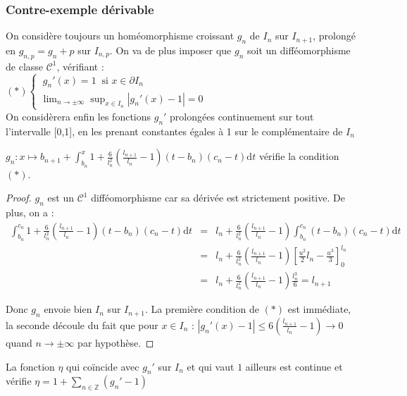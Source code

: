 \documentclass[11pt,a4paper]{article}
\begin{document}
\subsubsection{Contre-exemple dérivable}

On considère toujours un homéomorphisme croissant $g_n$ de $I_n$ sur $I_{n+1}$, prolongé en $g_{n,p} = g_n +p$ sur $I_{n,p}$. On va de plus imposer que $g_n$ soit un difféomorphisme de classe $\mathcal{C}^1$, vérifiant : \\

$(*) \begin{cases}\ g_n'(x)=1 \ \text{ si } x \in \partial I_n \\ \displaystyle \lim_{n \to \pm \infty}\sup_{x\in I_n}|g_n'(x)-1|=0 \end{cases}$ \\

On considèrera enfin les fonctions $g_n'$ prolongées continuement sur tout l'intervalle [0,1], en les prenant constantes égales à 1 sur le complémentaire de $I_n$

\begin{lemma}
$\displaystyle g_n : x \mapsto b_{n+1} + \int_{b_n}^x 1 + \frac{6}{l_n^2}(\frac{l_{n+1}}{l_n} -1)(t-b_n)(c_n-t)\mathrm{d}t$ vérifie la condition $(*)$.
\end{lemma}

\begin{proof}
$g_n$ est un $\mathcal{C}^1$ difféomorphisme car sa dérivée est strictement positive. De plus, on a :
\begin{eqnarray*}
\int_{b_n}^{c_n} 1 + \frac{6}{l_n^2}(\frac{l_{n+1}}{l_n} -1)(t-b_n)(c_n-t)\mathrm{d}t &=& l_n +  \frac{6}{l_n^2}(\frac{l_{n+1}}{l_n} -1)\int_{b_n}^{c_n} (t-b_n)(c_n-t)\mathrm{d}t \\
&=& l_n +  \frac{6}{l_n^2}(\frac{l_{n+1}}{l_n} -1) \left [\frac{u^2}{2}l_n - \frac{u^3}{3}\right ]^{l_n}_0 \\
&=& l_n +  \frac{6}{l_n^2}(\frac{l_{n+1}}{l_n} -1) \frac{l_n^3}{6} = l_{n+1}
\end{eqnarray*}

Donc $g_n$ envoie bien $I_n$ sur $I_{n+1}$. La première condition de $(*)$ est immédiate, la seconde découle du fait que pour $x\in I_n$ : $ \displaystyle |g_n'(x) -1| \leq 6(\frac{l_{n+1}}{l_n} -1) \to 0 $ quand $n\to \pm \infty$ par hypothèse. 
\end{proof}

\begin{lemma}
La fonction $\eta$ qui coïncide avec $g_n'$ sur $I_n$ et qui vaut $1$ ailleurs est continue et vérifie $\displaystyle \eta =  1 + \sum_{n \in \mathbb{Z}} (g_n'-1)$
\end{lemma}
\end{document}
